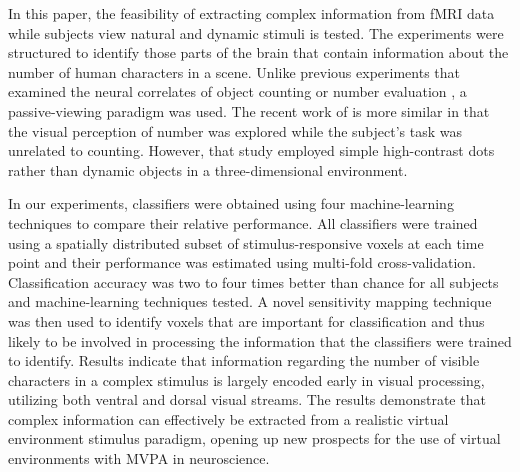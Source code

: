 \documentclass[5p,authoryear]{elsarticle}
\begin{document}
In this paper, the feasibility of extracting complex information from fMRI data while subjects view natural and dynamic stimuli is tested.
The experiments were structured to identify those parts of the brain that contain information about the number of human characters in a scene.
Unlike previous experiments that examined the neural correlates of object counting or number evaluation \citep{Dehaene1999,Rickard2000,Barth2006}, a passive-viewing paradigm was used.
The recent work of \cite{Harvey2013} is more similar in that the visual perception of number was explored while the subject's task was unrelated to counting.
However, that study employed simple high-contrast dots rather than dynamic objects in a three-dimensional environment.

In our experiments, classifiers were obtained using four machine-learning techniques to compare their relative performance. 
All classifiers were trained using a spatially distributed subset of stimulus-responsive voxels at each time point and their performance was estimated using multi-fold cross-validation. 
Classification accuracy was two to four times better than chance for all subjects and machine-learning techniques tested.
A novel sensitivity mapping technique was then used to identify voxels that are important for classification and thus likely to be involved in processing the information that the classifiers were trained to identify.
Results indicate that information regarding  the number of visible characters in a complex stimulus is largely encoded early in visual processing, utilizing both ventral and dorsal visual streams.
The results demonstrate that complex information can effectively be extracted from a realistic virtual environment stimulus paradigm, opening up new prospects for the use of virtual environments with MVPA in neuroscience.
\end{document}
